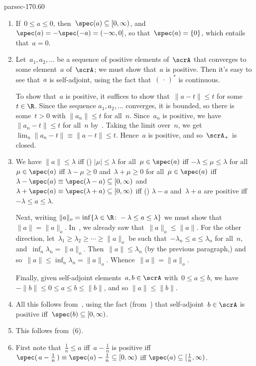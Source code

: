 \documentclass[b5page]{book}
\begin{document}
\begin{solution}{parsec-170.60}
\begin{enumerate}
\item
If~$0\leq a\leq 0$,
then~$\spec(a)\subseteq [0,\infty)$,
and~$\spec(a)=-\spec(-a)= (-\infty,0]$,
so that~$\spec(a)=\{0\}$,
which entails that~$a=0$.
\item
Let~$a_1,a_2,\dotsc$ be a sequence of positive elements
of~$\scrA$ that converges to some element~$a$ of~$\scrA$;
we must show that~$a$ is positive.
Then it's easy to see that~$a$ is self-adjoint,
using the fact that~$(\,\cdot\,)^*$ is continuous.

To show that~$a$ is positive,
it suffices to show that~$\|a-t\|\leq t$ for some~$t\in \R$.
Since the sequence $a_1,a_2,\dotsc$  converges,
it is bounded,
so there is some~$t>0$ with $\|a_n\|\leq t$ for all~$n$.
Since~$a_n$ is positive,
we have~$\|a_n-t\|\leq t$ for all~$n$
by~.
Taking the limit over~$n$,
we get $\lim_n\|a_n-t\|\equiv \|a-t\|\leq t$.
Hence~$a$ is positive, and so~$\scrA_+$ is closed.

\item
We have
$\|a\|\leq \lambda$
iff () $\left|\mu\right|\leq \lambda$
for all~$\mu\in\spec(a)$
iff $-\lambda \leq \mu \leq \lambda$
for all~$\mu\in\spec(a)$
iff
$\lambda-\mu\geq 0$ and~$\lambda+\mu\geq 0$
for all~$\mu\in\spec(a)$
iff
$\lambda-\spec(a)\equiv\spec(\lambda-a)\subseteq [0,\infty)$
and $\lambda+\spec(a)\equiv\spec(\lambda+a)\subseteq [0,\infty)$
iff ()
$\lambda -a$ and~$\lambda+a$ are positive
iff~$-\lambda \leq a\leq \lambda$.

Next,
writing $\|a\|_o = \inf\{\lambda\in \R\colon -\lambda\leq a \leq \lambda\}$
we must show that~$\|a\|=\|a\|_o$.
In~,
we already saw that~$\|a\|_o\leq \|a\|$.
For the other direction,
let~$\lambda_1\geq \lambda_2\geq\dotsb\geq \|a\|_o$
be such that~$-\lambda_n \leq a\leq \lambda_n$
for all~$n$,
and~$\inf_n \lambda_n = \|a\|_o$.
Then~$\|a\|\leq \lambda_n$
(by the previous paragraph,)
and so~$\|a\|\leq \inf_n\lambda_n = \|a\|_o$.
Whence~$\|a\|=\|a\|_o$.

Finally,
given self-adjoint elements~$a,b\in\scrA$ with~$0\leq a\leq b$,
we have~$-\|b\|\leq 0\leq a \leq b\leq \|b\|$,
and so $\|a\|\leq\|b\|$.
\item
All this follows from~,
using the fact (from~) that self-adjoint~$b\in\scrA$
is positive iff~$\spec(b)\subseteq[0,\infty)$.
\item
This follows from~(6).
\item
First note that~$\frac{1}{n}\leq a$
iff~$a-\frac{1}{n}$ is positive
iff $\spec(\,a-\frac{1}{n}\,)\equiv \spec(a)-\frac{1}{n} \subseteq [0,\infty)$
iff $\spec(a)\subseteq [\frac{1}{n},\infty)$.


\end{enumerate}
\end{solution}
\end{document}
